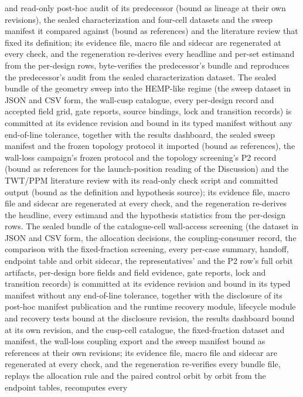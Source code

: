 \documentclass[11pt]{article}
\begin{document}
and read-only post-hoc audit of its predecessor (bound as lineage at their own
revisions), the sealed characterization and four-cell datasets and the sweep
manifest it compared against (bound as references) and the literature review
that fixed its definition; its evidence file, macro file and sidecar are
regenerated at every check, and the regeneration re-derives every headline and
per-set estimand from the per-design rows, byte-verifies the predecessor's
bundle and reproduces the predecessor's audit from the sealed characterization
dataset. The sealed bundle of the geometry sweep into the HEMP-like regime (the
sweep dataset in JSON and CSV form, the wall-cusp catalogue, every per-design
record and accepted field grid, gate reports, source bindings, lock and transition
records) is committed at its evidence revision and bound in its typed manifest
without any end-of-line tolerance, together with the results dashboard, the sealed
sweep manifest and the frozen topology protocol it imported (bound as references),
the wall-loss campaign's frozen protocol and the topology screening's P2 record
(bound as references for the launch-position reading of the Discussion) and the
TWT/PPM literature review with its read-only check script and committed output
(bound as the definition and hypothesis source); its evidence file, macro file and
sidecar are regenerated at every check, and the regeneration re-derives the
headline, every estimand and the hypothesis statistics from the per-design rows.
The sealed bundle of the catalogue-cell wall-access screening (the dataset in JSON
and CSV form, the allocation decisions, the coupling-consumer record, the comparison
with the fixed-fraction screening, every per-case summary, handoff, endpoint table
and orbit sidecar, the representatives' and the P2 row's full orbit artifacts,
per-design bore fields and field evidence, gate reports, lock and transition
records) is committed at its evidence revision and bound in its typed manifest
without any end-of-line tolerance, together with the disclosure of its post-hoc
manifest publication and the runtime recovery module, lifecycle module and recovery
tests bound at the disclosure revision, the results dashboard bound at its own
revision, and the cusp-cell catalogue, the fixed-fraction dataset and manifest, the
wall-loss coupling export and the sweep manifest bound as references at their own
revisions; its evidence file, macro file and sidecar are regenerated at every check,
and the regeneration re-verifies every bundle file, replays the allocation rule and
the paired control orbit by orbit from the endpoint tables, recomputes every
\end{document}
